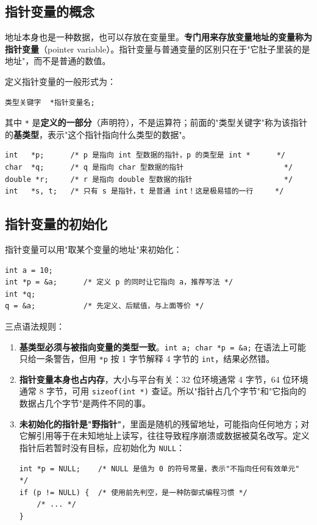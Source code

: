 \subsection{指针变量的概念}
地址本身也是一种数据，也可以存放在变量里。\textbf{专门用来存放变量地址的变量称为指针变量}（pointer variable）。指针变量与普通变量的区别只在于"它肚子里装的是地址"，而不是普通的数值。

定义指针变量的一般形式为：
\begin{verbatim}
类型关键字  *指针变量名;
\end{verbatim}
其中 \texttt{*} 是\textbf{定义的一部分}（声明符），不是运算符；前面的"类型关键字"称为该指针的\textbf{基类型}，表示"这个指针指向什么类型的数据"。

\begin{lstlisting}
int   *p;      /* p 是指向 int 型数据的指针，p 的类型是 int *      */
char  *q;      /* q 是指向 char 型数据的指针                       */
double *r;     /* r 是指向 double 型数据的指针                     */
int   *s, t;   /* 只有 s 是指针，t 是普通 int！这是极易错的一行     */
\end{lstlisting}


\subsection{指针变量的初始化}
指针变量可以用"取某个变量的地址"来初始化：
\begin{lstlisting}
int a = 10;
int *p = &a;      /* 定义 p 的同时让它指向 a，推荐写法 */
int *q;
q = &a;           /* 先定义、后赋值，与上面等价 */
\end{lstlisting}

三点语法规则：
\begin{enumerate}
  \item \textbf{基类型必须与被指向变量的类型一致}。\texttt{int a; char *p = \&a;} 在语法上可能只给一条警告，但用 \texttt{*p} 按 1 字节解释 4 字节的 \texttt{int}，结果必然错。
  \item \textbf{指针变量本身也占内存}，大小与平台有关：32 位环境通常 4 字节，64 位环境通常 8 字节，可用 \texttt{sizeof(int *)} 查证。所以"指针占几个字节"和"它指向的数据占几个字节"是两件不同的事。
  \item \textbf{未初始化的指针是"野指针"}，里面是随机的残留地址，可能指向任何地方；对它解引用等于在未知地址上读写，往往导致程序崩溃或数据被莫名改写。定义指针后若暂时没有目标，应初始化为 \texttt{NULL}：
\begin{lstlisting}
int *p = NULL;    /* NULL 是值为 0 的符号常量，表示"不指向任何有效单元" */
if (p != NULL) {  /* 使用前先判空，是一种防御式编程习惯 */
    /* ... */
}
\end{lstlisting}
\end{enumerate}


